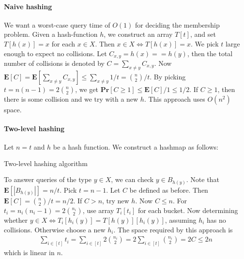 \documentclass[12pt]{article}
\begin{document}
\paragraph{Naive hashing} We want a worst-case query time of $O(1)$ for deciding the membership problem. Given a hash-function $h$, we construct an array $T[t]$, and set $T[h(x)] = x$ for each $x \in X$. Then $x \in X \Leftrightarrow T[h(x)] = x$. We pick $t$ large enough to expect no collisions. Let $C_{x,y} = h(x) == h(y)$, then the total number of collisions is denoted by $C = \sum_{x \neq y} C_{x,y}$. Now $\mathbf{E}\left[ C \right] = \mathbf{E}\left[ \sum_{x \neq y} C_{x,y} \right] \leq \sum_{x \neq y} 1/t = \binom{n}{2}/t$. By picking $t=n(n-1)=2\binom{n}{2}$, we get $\mathbf{Pr} \left[ C \geq 1 \right] \leq \mathbf{E}\left[ C \right] / 1 \leq 1/2$. If $C \geq 1$, then there is some collision and we try with a new $h$. This approach uses $O(n^2)$ space.

\paragraph{Two-level hashing} Let $n=t$ and $h$ be a hash function. We construct a hashmap as follows:

\begin{algorithm}[H]
 \caption{Two-level hashing algorithm}
\end{algorithm}
To answer queries of the type $y \in X$, we can check $y \in B_{h(y)}$. Note that $\mathbf{E} \left[ |B_{h(y)}| \right] = n/t$. Pick $t = n-1$. Let $C$ be defined as before. Then $\mathbf{E} \left[ C \right] = \binom{n}{2}/t = n/2$. If $C > n$, try new $h$. Now $C \leq n$. For $t_i=n_i(n_i-1) = 2\binom{n_i}{2}$, use array $T_i[t_i]$ for each bucket. Now determining whether $y \in X \Leftrightarrow T_i[h_i(y)] = T[h(y)][h_i(y)]$, assuming $h_i$ has no collisions. Otherwise choose a new $h_i$. The space required by this approach is
\begin{align*}
\sum_{i \in [t]} t_i = \sum_{i \in [t]}2\binom{n_i}{2} = 2\sum_{i \in [t]}\binom{n_i}{2} = 2C \leq 2n
\end{align*}
which is linear in $n$.
\end{document}
